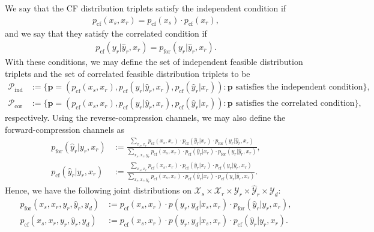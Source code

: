 \documentclass[12pt]{article}
\theoremstyle{definition}
\begin{document}
We say that the CF distribution triplets satisfy the independent condition if
\begin{align}
    p_{\mathrm{cf}}(x_s, x_r) =  p_{\mathrm{cf}}(x_s) \cdot p_{\mathrm{cf}}(x_r), \label{eq: independent condition}
\end{align}
and we say that they satisfy the correlated condition if
\begin{align}
    p_{\mathrm{cf}}(y_r|\hat{y}_r, x_r) = p_{\mathrm{for}}(y_r | \hat{y}_r, x_r). \label{eq: correlated condition}
\end{align}
With these conditions, we may define the set of independent feasible distribution triplets and the set of correlated feasible distribution triplets to be 
\begin{align*}
    \mathcal P_{\mathrm{ind}} &:= \{ \mathbf{p} = (p_{\mathrm{cf}}(x_s, x_r), p_{\mathrm{cf}}(y_r | \hat{y}_r, x_r), p_{\mathrm{cf}}(\hat{y}_r | x_r)) : \mathbf{p} \text{ satisfies the independent condition}\}, \\
    \mathcal P_{\mathrm{cor}} & := \{\mathbf{p} = (p_{\mathrm{cf}}(x_s, x_r), p_{\mathrm{cf}}(y_r | \hat{y}_r, x_r), p_{\mathrm{cf}}(\hat{y}_r | x_r)) : \mathbf{p} \text{ satisfies the correlated condition}\},
\end{align*}
respectively. Using the reverse-compression channels, we may also define the forward-compression channels as 
\begin{align*}
    p_{\mathrm{for}}(\hat{y}_r | y_r, x_r) & := \frac{\sum_{x_s, x_r}p_{\mathrm{cf}}(x_s, x_r) \cdot p_{\mathrm{cf}}(\hat{y}_r|x_r) \cdot p_{\mathrm{for}}(y_r | \hat{y}_r, x_r)}{\sum_{x_s, x_r, y_r}p_{\mathrm{cf}}(x_s, x_r) \cdot p_{\mathrm{cf}}(\hat{y}_r|x_r) \cdot p_{\mathrm{for}}(y_r | \hat{y}_r, x_r)}, \\
    p_{\mathrm{cf}}(\hat{y}_r | y_r, x_r) & := \frac{\sum_{x_s, x_r}p_{\mathrm{cf}}(x_s, x_r) \cdot p_{\mathrm{cf}}(\hat{y}_r|x_r) \cdot p_{\mathrm{cf}}(y_r | \hat{y}_r, x_r)}{\sum_{x_s, x_r, y_r}p_{\mathrm{cf}}(x_s, x_r) \cdot p_{\mathrm{cf}}(\hat{y}_r|x_r) \cdot p_{\mathrm{cf}}(y_r | \hat{y}_r, x_r)}.
\end{align*}
Hence, we have the following joint distributions on $\mathcal X_s \times \mathcal X_r \times \mathcal Y_r \times \hat{\mathcal Y}_r \times \mathcal Y_d$:
\begin{align}
    p_{\mathrm{for}}(x_s, x_r, y_r, \hat{y}_r, y_d) & := p_{\mathrm{cf}}(x_s, x_r) \cdot p(y_r, y_d| x_s, x_r) \cdot p_{\mathrm{for}}(\hat{y}_r | y_r ,x_r), \\ %
    p_{\mathrm{cf}}(x_s, x_r, y_r, \hat{y}_r, y_d) & := p_{\mathrm{cf}}(x_s, x_r) \cdot p(y_r, y_d| x_s, x_r) \cdot p_{\mathrm{cf}}(\hat{y}_r | y_r ,x_r). %
\end{align}
\end{document}
